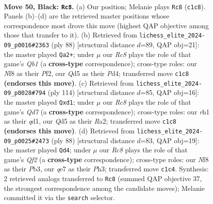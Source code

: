 \documentclass[11pt]{article}
\begin{document}
\clearpage

\begin{figure}[p]\centering
\begin{subfigure}{0.46\textwidth}\centering
\resizebox{\linewidth}{!}{%
\newchessgame
\chessboard[
  setfen={5nk1/1p2Q2p/8/3q3p/8/6N1/5R1K/2r4R b - - 13 50},
  showmover=false,
  pgfstyle=straightmove, color=movearrow, markmove={c1-c8}
]}
\caption{}
\end{subfigure}\hfill
\begin{subfigure}{0.46\textwidth}\centering
\resizebox{\linewidth}{!}{%
\newchessgame
\chessboard[
  setfen={2R5/kr2q3/2p5/4P2p/3P4/8/5PP1/1Q4K1 w - - 5 45},
  showmover=false,
  pgfstyle=straightmove, color=movearrow, markmove={b1-a2}
]}
\caption{}
\end{subfigure}
\\[4pt]
\begin{subfigure}{0.46\textwidth}\centering
\resizebox{\linewidth}{!}{%
\newchessgame
\chessboard[
  setfen={8/3Q4/8/1P4K1/6P1/1rk1p3/R7/3q4 w - - 9 58},
  showmover=false,
  pgfstyle=straightmove, color=movearrow, markmove={d7-d1}
]}
\caption{}
\end{subfigure}\hfill
\begin{subfigure}{0.46\textwidth}\centering
\resizebox{\linewidth}{!}{%
\newchessgame
\chessboard[
  setfen={3R4/1q3r1k/6pp/8/8/1P5P/5QP1/6K1 w - - 1 45},
  showmover=false,
  pgfstyle=straightmove, color=movearrow, markmove={f2-d4}
]}
\caption{}
\end{subfigure}
\caption{\textbf{Move 50, Black: \texttt{Rc8}.} (a) Our position; Melanie plays \texttt{Rc8} (\texttt{c1c8}). Panels (b)--(d) are the retrieved master positions whose correspondence most drove this move (highest QAP objective among those that transfer to it). (b) Retrieved from \texttt{lichess\_elite\_2024-09\_p0016\#2363} (ply 88) [structural distance $d$=89, QAP obj=21]: the master played \texttt{Qa2+}; under $\mu$ our \emph{Rc8} plays the role of that game's \emph{Qb1} (a \textbf{cross-type} correspondence); cross-type roles: our \emph{N}f8 as their \emph{P}f2, our \emph{Q}d5 as their \emph{P}d4; transferred move \texttt{c1c8} \textbf{(endorses this move)}. (c) Retrieved from \texttt{lichess\_elite\_2024-09\_p0028\#794} (ply 114) [structural distance $d$=85, QAP obj=16]: the master played \texttt{Qxd1}; under $\mu$ our \emph{Rc8} plays the role of that game's \emph{Qd7} (a \textbf{cross-type} correspondence); cross-type roles: our \emph{r}h1 as their \emph{q}d1, our \emph{Q}d5 as their \emph{R}a2; transferred move \texttt{c1c8} \textbf{(endorses this move)}. (d) Retrieved from \texttt{lichess\_elite\_2024-09\_p0025\#2473} (ply 88) [structural distance $d$=83, QAP obj=19]: the master played \texttt{Qd4}; under $\mu$ our \emph{Rc8} plays the role of that game's \emph{Qf2} (a \textbf{cross-type} correspondence); cross-type roles: our \emph{N}f8 as their \emph{P}b3, our \emph{q}e7 as their \emph{P}h3; transferred move \texttt{c1c4}. Synthesis: 2 retrieved analogs transferred to \texttt{Rc8} (summed QAP objective 37, the strongest correspondence among the candidate moves); Melanie committed it via the \texttt{search} selector.}
\label{fig:thought-m99}
\end{figure}
\end{document}
